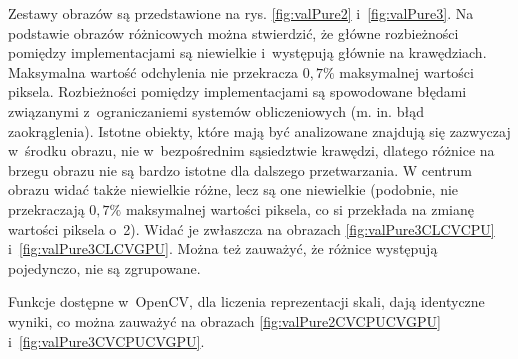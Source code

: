 Zestawy obrazów są przedstawione na rys. \ref{fig:valPure2} i~\ref{fig:valPure3}. Na podstawie obrazów różnicowych można stwierdzić, że główne rozbieżności pomiędzy implementacjami są niewielkie i~występują głównie na krawędziach. Maksymalna wartość odchylenia nie przekracza $ 0,7\% $ maksymalnej wartości piksela. Rozbieżności pomiędzy implementacjami są spowodowane błędami związanymi z~ograniczaniemi systemów obliczeniowych (m. in. błąd zaokrąglenia). Istotne obiekty, które mają być analizowane znajdują się zazwyczaj w~środku obrazu, nie w~bezpośrednim sąsiedztwie krawędzi, dlatego różnice na brzegu obrazu nie są bardzo istotne dla dalszego przetwarzania. W centrum obrazu widać także niewielkie różne, lecz są one niewielkie (podobnie, nie przekraczają $ 0,7\% $ maksymalnej wartości piksela, co si przekłada na zmianę wartości piksela o~2). Widać je zwłaszcza na obrazach \ref{fig:valPure3CLCVCPU} i~\ref{fig:valPure3CLCVGPU}. Można też zauważyć, że różnice występują pojedynczo, nie są zgrupowane.

Funkcje dostępne w~OpenCV, dla liczenia reprezentacji skali, dają identyczne wyniki, co można zauważyć na obrazach \ref{fig:valPure2CVCPUCVGPU} i~\ref{fig:valPure3CVCPUCVGPU}.

